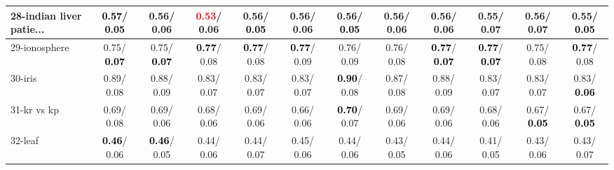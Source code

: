\begin{table}[h]
\begin{center}
{\begin{tabular}{lc|c|c|c|c|c|c|c|c|c|c}
28-indian liver patie... & \textcolor{black}{\textbf{  0.57}}/\textcolor{black}{\textbf{  0.05}} &   0.56/  0.06 & \textcolor{red}{\textbf{  0.53}}/  0.06 &   0.56/\textcolor{black}{\textbf{  0.05}} &   0.56/  0.06 &   0.56/\textcolor{black}{\textbf{  0.05}} &   0.56/  0.06 &   0.56/  0.06 &   0.55/  0.07 &   0.56/  0.07 &   0.55/\textcolor{black}{\textbf{  0.05}} \\ \hline
29-ionosphere &   0.75/\textcolor{black}{\textbf{  0.07}} &   0.75/\textcolor{black}{\textbf{  0.07}} & \textcolor{black}{\textbf{  0.77}}/  0.08 & \textcolor{black}{\textbf{  0.77}}/  0.08 & \textcolor{black}{\textbf{  0.77}}/  0.09 &   0.76/  0.09 &   0.76/  0.08 & \textcolor{black}{\textbf{  0.77}}/\textcolor{black}{\textbf{  0.07}} & \textcolor{black}{\textbf{  0.77}}/\textcolor{black}{\textbf{  0.07}} &   0.75/  0.08 & \textcolor{black}{\textbf{  0.77}}/  0.08 \\
30-iris &   0.89/  0.08 &   0.88/  0.09 &   0.83/  0.07 &   0.83/  0.07 &   0.83/  0.07 & \textcolor{black}{\textbf{  0.90}}/  0.08 &   0.87/  0.08 &   0.88/  0.09 &   0.83/  0.07 &   0.83/  0.07 &   0.83/\textcolor{black}{\textbf{  0.06}} \\
31-kr vs kp &   0.69/  0.08 &   0.69/  0.06 &   0.68/  0.06 &   0.69/  0.06 &   0.66/  0.06 & \textcolor{black}{\textbf{  0.70}}/  0.07 &   0.69/  0.06 &   0.69/  0.06 &   0.68/  0.06 &   0.67/\textcolor{black}{\textbf{  0.05}} &   0.67/\textcolor{black}{\textbf{  0.05}} \\
32-leaf & \textcolor{black}{\textbf{  0.46}}/  0.06 & \textcolor{black}{\textbf{  0.46}}/  0.05 &   0.44/  0.06 &   0.44/  0.07 &   0.45/  0.06 &   0.44/  0.06 &   0.43/  0.05 &   0.44/  0.06 &   0.41/  0.05 &   0.43/  0.06 &   0.43/  0.07 \\\end{tabular}}\label{stratsBalAcc0bIELM}
\end{center}
\end{table}
